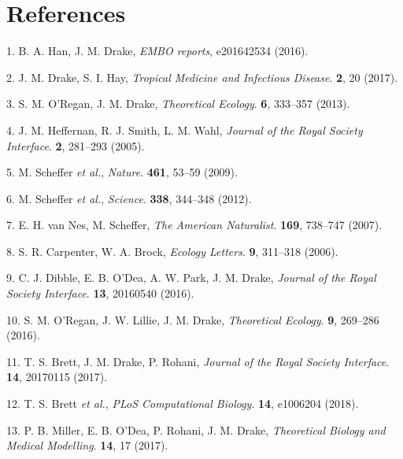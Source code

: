 \documentclass[3p]{elsarticle} %
\begin{document}
\hypertarget{references}{%
\section*{References}\label{references}}

\hypertarget{refs}{}
\leavevmode\hypertarget{ref-Han2016}{}%
1. B. A. Han, J. M. Drake, \emph{EMBO reports}, e201642534 (2016).

\leavevmode\hypertarget{ref-Drake2017}{}%
2. J. M. Drake, S. I. Hay, \emph{Tropical Medicine and Infectious
Disease}. \textbf{2}, 20 (2017).

\leavevmode\hypertarget{ref-ORegan2013}{}%
3. S. M. O'Regan, J. M. Drake, \emph{Theoretical Ecology}. \textbf{6},
333--357 (2013).

\leavevmode\hypertarget{ref-Heffernan2005}{}%
4. J. M. Heffernan, R. J. Smith, L. M. Wahl, \emph{Journal of the Royal
Society Interface}. \textbf{2}, 281--293 (2005).

\leavevmode\hypertarget{ref-Scheffer2009}{}%
5. M. Scheffer \emph{et al.}, \emph{Nature}. \textbf{461}, 53--59
(2009).

\leavevmode\hypertarget{ref-Scheffer2012}{}%
6. M. Scheffer \emph{et al.}, \emph{Science}. \textbf{338}, 344--348
(2012).

\leavevmode\hypertarget{ref-VanNes2007}{}%
7. E. H. van Nes, M. Scheffer, \emph{The American Naturalist}.
\textbf{169}, 738--747 (2007).

\leavevmode\hypertarget{ref-Carpenter2006}{}%
8. S. R. Carpenter, W. A. Brock, \emph{Ecology Letters}. \textbf{9},
311--318 (2006).

\leavevmode\hypertarget{ref-Dibble2016}{}%
9. C. J. Dibble, E. B. O'Dea, A. W. Park, J. M. Drake, \emph{Journal of
the Royal Society Interface}. \textbf{13}, 20160540 (2016).

\leavevmode\hypertarget{ref-ORegan2016}{}%
10. S. M. O'Regan, J. W. Lillie, J. M. Drake, \emph{Theoretical
Ecology}. \textbf{9}, 269--286 (2016).

\leavevmode\hypertarget{ref-Brett2017}{}%
11. T. S. Brett, J. M. Drake, P. Rohani, \emph{Journal of the Royal
Society Interface}. \textbf{14}, 20170115 (2017).

\leavevmode\hypertarget{ref-Brett2018}{}%
12. T. S. Brett \emph{et al.}, \emph{PLoS Computational Biology}.
\textbf{14}, e1006204 (2018).

\leavevmode\hypertarget{ref-Miller2017}{}%
13. P. B. Miller, E. B. O'Dea, P. Rohani, J. M. Drake, \emph{Theoretical
Biology and Medical Modelling}. \textbf{14}, 17 (2017).
\end{document}
